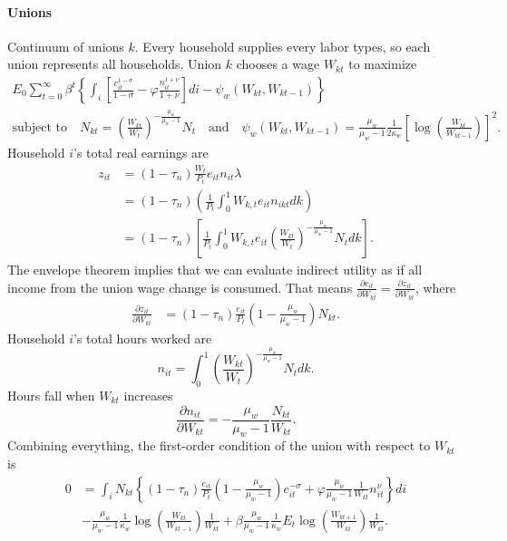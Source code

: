 \documentclass[11pt,a4paper]{article}
\begin{document}
\paragraph{Unions}
Continuum of unions $k$. Every household supplies every labor types, so each union represents all households. Union $k$ chooses a wage $W_{kt}$ to maximize
\begin{equation*}
\begin{gathered}
E_0\sum_{t=0}^{\infty}\beta^t\left\{\int_i\left[\frac{c_{it}^{1-\sigma}}{1-\sigma}-\varphi\frac{n_{it}^{1+\nu}}{1+\nu}\right]di-\psi_w(W_{kt},W_{kt-1})\right\}\\
\text{subject to}\quad N_{kt}=\left(\frac{W_{kt}}{W_t}\right)^{-\frac{\mu_w}{\mu_w-1}}N_t\quad\text{and}\quad\psi_w(W_{kt},W_{kt-1})=\frac{\mu_w}{\mu_w-1}\frac{1}{2\kappa_w}\left[\log\left(\frac{W_{kt}}{W_{kt-1}}\right)\right]^2.
\end{gathered}
\end{equation*}
Household $i$'s total real earnings are
\begin{align*}
z_{it}&=(1-\tau_n)\frac{W_{t}}{P_t}e_{it}n_{it}\lambda\\
&=(1-\tau_n)\left(\frac{1}{P_t}\int_0^1W_{k,t}e_{it}n_{ikt}dk\right)\\
&=(1-\tau_n)\left[\frac{1}{P_t}\int_0^1W_{k,t}e_{it}\left(\frac{W_{kt}}{W_t}\right)^{-\frac{\mu_w}{\mu_w-1}}N_tdk\right].
\end{align*}
The envelope theorem implies that we can evaluate indirect utility as if all income from the union wage change is consumed. That means $\frac{\partial c_{it}}{\partial W_{kt}}=\frac{\partial z_{it}}{\partial W_{kt}}$, where
\begin{align*}
\frac{\partial z_{it}}{\partial W_{kt}}&=(1-\tau_n)\frac{e_{it}}{P_t}\left(1-\frac{\mu_w}{\mu_w-1}\right)N_{kt}.
\end{align*}
Household $i$'s total hours worked are
\begin{equation*}
n_{it}=\int_0^1\left(\frac{W_{kt}}{W_t}\right)^{-\frac{\mu_w}{\mu_w-1}}N_tdk.
\end{equation*}
Hours fall when $W_{kt}$ increases 
\begin{equation*}
\frac{\partial n_{it}}{\partial W_{kt}}=-\frac{\mu_w}{\mu_w-1}\frac{N_{kt}}{W_{kt}}.
\end{equation*}
Combining everything, the first-order condition of the union with respect to $W_{kt}$ is
\begin{equation*}
\begin{split}
0&=\int_i N_{kt}\left\{(1-\tau_n)\frac{e_{it}}{P_t}\left(1-\frac{\mu_w}{\mu_w-1}\right)c_{it}^{-\sigma}+\varphi\frac{\mu_w}{\mu_w-1}\frac{1}{W_{kt}}n_{it}^{\nu}\right\}di\\
&-\frac{\mu_w}{\mu_w-1}\frac{1}{\kappa_w}\log\left(\frac{W_{kt}}{W_{kt-1}}\right)\frac{1}{W_{kt}}+\beta\frac{\mu_w}{\mu_w-1}\frac{1}{\kappa_w}E_t\log\left(\frac{W_{kt+1}}{W_{kt}}\right)\frac{1}{W_{kt}}.
\end{split}
\end{equation*}
\end{document}

